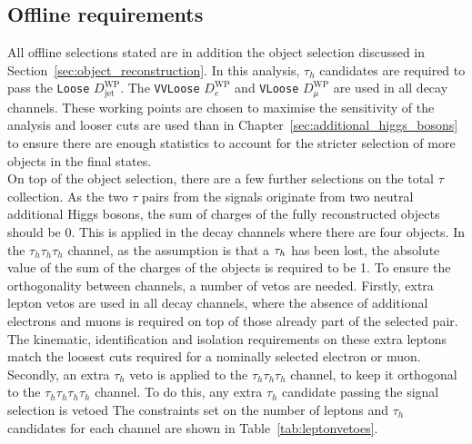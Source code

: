 \subsection{Offline requirements}

All offline selections stated are in addition the object selection discussed in Section~\ref{sec:object_reconstruction}.
In this analysis, $\tau_h$ candidates are required to pass the \texttt{Loose} $D_{\text{jet}}^{\text{WP}}$.
The \texttt{VVLoose} $D_{e}^{\text{WP}}$ and \texttt{VLoose} $D_{\mu}^{\text{WP}}$ are used in all decay channels.
These working points are chosen to maximise the sensitivity of the analysis and looser cuts are used than in Chapter~\ref{sec:additional_higgs_bosons} to ensure there are enough statistics to account for the stricter selection of more objects in the final states. \\

On top of the object selection, there are a few further selections on the total $\tau$ collection.
As the two $\tau$ pairs from the signals originate from two neutral additional Higgs bosons, the sum of charges of the fully reconstructed objects should be 0. 
This is applied in the decay channels where there are four objects. 
In the $\tau_h \tau_h \tau_h$ channel, as the assumption is that a $\tau_{h}$ has been lost, the absolute value of the sum of the charges of the objects is required to be 1.
To ensure the orthogonality between channels, a number of vetos are needed. 
Firstly, extra lepton vetos are used in all decay channels, where the absence of additional electrons and muons is required on top of those already part of the selected pair.
The kinematic, identification and isolation requirements on these extra leptons match the loosest cuts required for a nominally selected electron or muon.
Secondly, an extra $\tau_h$ veto is applied to the $\tau_h \tau_h \tau_h$ channel, to keep it orthogonal to the $\tau_h \tau_h \tau_h \tau_h$ channel.
To do this, any extra $\tau_h$ candidate passing the signal selection is vetoed
The constraints set on the number of leptons and $\tau_h$ candidates for each channel are shown in Table~\ref{tab:leptonvetoes}. \\

